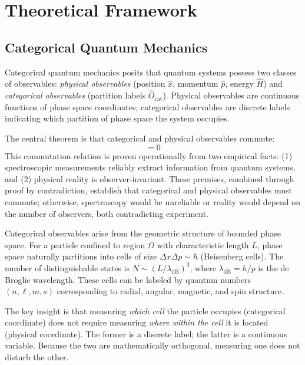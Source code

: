 \documentclass[twocolumn,10pt]{article}
\begin{document}
\section{Theoretical Framework}

\subsection{Categorical Quantum Mechanics}

Categorical quantum mechanics \cite{Sachikonye2026a} posits that quantum systems 
possess two classes of observables: \textit{physical observables} (position $\hat{x}$, 
momentum $\hat{p}$, energy $\hat{H}$) and \textit{categorical observables} 
(partition labels $\hat{O}_{\text{cat}}$). Physical observables are continuous 
functions of phase space coordinates; categorical observables are discrete labels 
indicating which partition of phase space the system occupies.

The central theorem is that categorical and physical observables commute:
%
\begin{equation}
[\hat{O}_{\text{cat}}, \hat{O}_{\text{phys}}] = 0
\label{eq:commutation}
\end{equation}
%
This commutation relation is proven operationally \cite{Sachikonye2026b} from 
two empirical facts: (1) spectroscopic measurements reliably extract information 
from quantum systems, and (2) physical reality is observer-invariant. These 
premises, combined through proof by contradiction, establish that categorical 
and physical observables must commute; otherwise, spectroscopy would be unreliable 
or reality would depend on the number of observers, both contradicting experiment.

Categorical observables arise from the geometric structure of bounded phase space. 
For a particle confined to region $\Omega$ with characteristic length $L$, phase 
space naturally partitions into cells of size $\Delta x \Delta p \sim \hbar$ 
(Heisenberg cells). The number of distinguishable states is $N \sim (L/\lambda_{\text{dB}})^3$, 
where $\lambda_{\text{dB}} = h/p$ is the de Broglie wavelength. These cells can 
be labeled by quantum numbers $(n, \ell, m, s)$ corresponding to radial, angular, 
magnetic, and spin structure.

The key insight is that measuring \textit{which cell} the particle occupies 
(categorical coordinate) does not require measuring \textit{where within the cell} 
it is located (physical coordinate). The former is a discrete label; the latter 
is a continuous variable. Because the two are mathematically orthogonal, measuring 
one does not disturb the other.
\end{document}
